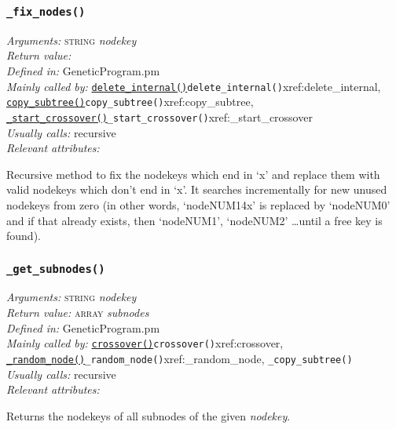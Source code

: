 \documentclass[a4paper]{article}
\begin{document}
\subsubsection{\texttt{\_fix\_nodes()}}\label{xref:_fix_nodes}
\begin{flushleft}
\textit{Arguments:} \textsc{string} \textit{nodekey}\\
\textit{Return value:} \\
\textit{Defined in:} GeneticProgram.pm\\
\textit{Mainly called by:} \hyperref[no]{\texttt{delete\_internal()}}{\texttt{delete\_internal()}}{xref:delete_internal}, \hyperref[no]{\texttt{copy\_subtree()}}{\texttt{copy\_subtree()}}{xref:copy_subtree}, \hyperref[no]{\texttt{\_start\_crossover()}}{\texttt{\_start\_crossover()}}{xref:_start_crossover}\\
\textit{Usually calls:} recursive\\
\textit{Relevant attributes:}
\end{flushleft}

Recursive method to fix the nodekeys which end in `x' and replace them
with valid nodekeys which don't end in `x'.  It searches incrementally
for new unused nodekeys from zero (in other words, `nodeNUM14x' is
replaced by `nodeNUM0' and if that already exists, then `nodeNUM1',
`nodeNUM2' \dots until a free key is found).

\subsubsection{\texttt{\_get\_subnodes()}}\label{xref:_get_subnodes}
\begin{flushleft}
\textit{Arguments:} \textsc{string} \textit{nodekey}\\
\textit{Return value:} \textsc{array} \textit{subnodes}\\
\textit{Defined in:} GeneticProgram.pm\\
\textit{Mainly called by:} \hyperref[no]{\texttt{crossover()}}{\texttt{crossover()}}{xref:crossover}, \hyperref[no]{\texttt{\_random\_node()}}{\texttt{\_random\_node()}}{xref:_random_node}, \texttt{\_copy\_subtree()}\\
\textit{Usually calls:} recursive\\
\textit{Relevant attributes:}
\end{flushleft}

Returns the nodekeys of all subnodes of the given \textit{nodekey}.
\end{document}
